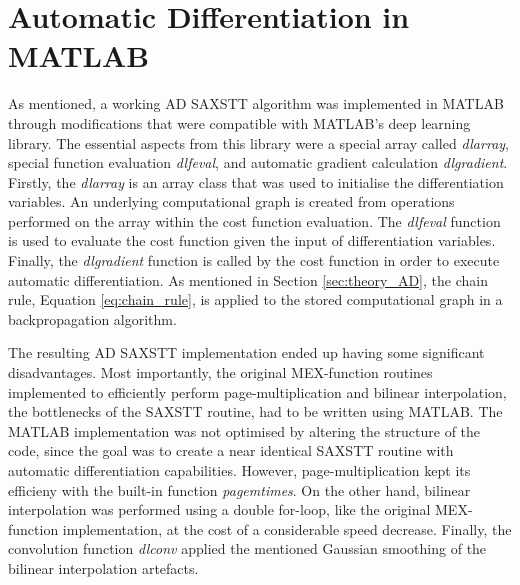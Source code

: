 \section{Automatic Differentiation in MATLAB}%
\label{sec:AD_matlab}
As mentioned,
a working AD SAXSTT algorithm was implemented  in MATLAB
through modifications that were compatible with MATLAB's deep learning library.
The essential aspects from this library were a special array called \emph{dlarray}, special function evaluation \emph{dlfeval}, and automatic gradient calculation \emph{dlgradient}.
Firstly, the \emph{dlarray} is an array class that was used to initialise the differentiation variables.
An underlying computational graph is created from operations performed on the array within the cost function evaluation.
The \emph{dlfeval} function is used to evaluate the cost function given the input of differentiation variables.
Finally, the \emph{dlgradient} function is called by the cost function in order to execute automatic differentiation.
As mentioned in Section \ref{sec:theory_AD}, the chain rule, Equation \eqref{eq:chain_rule}, is applied to the stored computational graph in a backpropagation algorithm.


The resulting AD SAXSTT implementation ended up having some significant disadvantages.
Most importantly, the original MEX-function routines implemented to efficiently perform page-multiplication and bilinear interpolation, the bottlenecks of the SAXSTT routine, had to be written using MATLAB.
The MATLAB implementation was not optimised by altering the structure of the code, since the goal was to create a near identical SAXSTT routine with automatic differentiation capabilities.
However, page-multiplication kept its efficieny with the built-in function \emph{pagemtimes}.
On the other hand, bilinear interpolation was performed using a double for-loop, like the original MEX-function implementation, at the cost of a considerable speed decrease.
Finally, the convolution function \emph{dlconv} applied the mentioned Gaussian smoothing of the bilinear interpolation artefacts.


